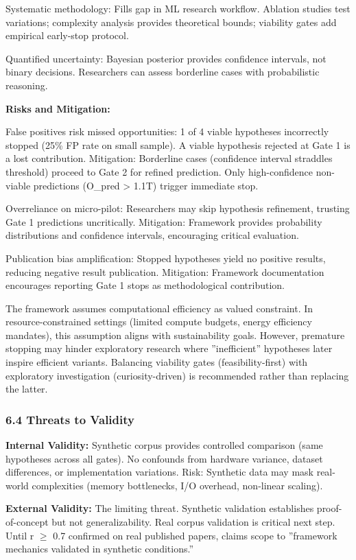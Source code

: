 Systematic methodology: Fills gap in ML research workflow. Ablation studies test variations; complexity analysis provides theoretical bounds; viability gates add empirical early-stop protocol.

Quantified uncertainty: Bayesian posterior provides confidence intervals, not binary decisions. Researchers can assess borderline cases with probabilistic reasoning.

\textbf{Risks and Mitigation:}

False positives risk missed opportunities: 1 of 4 viable hypotheses incorrectly stopped (25\% FP rate on small sample). A viable hypothesis rejected at Gate 1 is a lost contribution. Mitigation: Borderline cases (confidence interval straddles threshold) proceed to Gate 2 for refined prediction. Only high-confidence non-viable predictions (O\_pred > 1.1T) trigger immediate stop.

Overreliance on micro-pilot: Researchers may skip hypothesis refinement, trusting Gate 1 predictions uncritically. Mitigation: Framework provides probability distributions and confidence intervals, encouraging critical evaluation.

Publication bias amplification: Stopped hypotheses yield no positive results, reducing negative result publication. Mitigation: Framework documentation encourages reporting Gate 1 stops as methodological contribution.

The framework assumes computational efficiency as valued constraint. In resource-constrained settings (limited compute budgets, energy efficiency mandates), this assumption aligns with sustainability goals. However, premature stopping may hinder exploratory research where ''inefficient'' hypotheses later inspire efficient variants. Balancing viability gates (feasibility-first) with exploratory investigation (curiosity-driven) is recommended rather than replacing the latter.

\subsubsection{6.4 Threats to Validity}

\textbf{Internal Validity:} Synthetic corpus provides controlled comparison (same hypotheses across all gates). No confounds from hardware variance, dataset differences, or implementation variations. Risk: Synthetic data may mask real-world complexities (memory bottlenecks, I/O overhead, non-linear scaling).

\textbf{External Validity:} The limiting threat. Synthetic validation establishes proof-of-concept but not generalizability. Real corpus validation is critical next step. Until r $\geq$ 0.7 confirmed on real published papers, claims scope to ''framework mechanics validated in synthetic conditions.''

